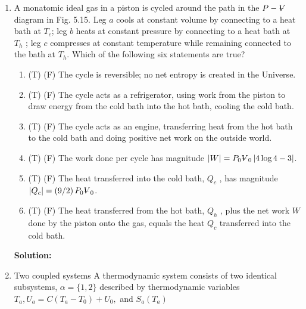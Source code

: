 \documentclass[10pt]{article}
\newenvironment{Solution}
    {\textbf{Solution:}
    
    \vspace{5mm}
    \begin{tcolorbox}
    }
    {
    \end{tcolorbox}
    \vspace{5mm}
    }
\newcommand{\vol}{{\ooalign{\hfil$V$\hfil\cr\kern0.08em--\hfil\cr}}}
\begin{document}
\begin{enumerate}
\begin{enumerate}
\begin{Solution}
    
    \end{Solution}
\end{enumerate}

\item A monatomic ideal gas in a piston is cycled around the path in the $P -\vol$ diagram in Fig. 5.15. Leg $a$ cools at constant volume by connecting to a heat bath at $T_c$; leg $b$ heats at constant pressure by connecting to a heat bath at $T_h$ ; leg $c$ compresses at constant temperature while remaining connected to the bath at $T_h$.
Which of the following six statements are true?
\begin{enumerate}
    \item (T) (F) The cycle is reversible; no net entropy is created in the Universe.
    
    \item (T) (F) The cycle acts as a refrigerator, using work from the piston to draw energy from the cold bath into the hot bath, cooling the cold bath.
    
    
    \item (T) (F) The cycle acts as an engine, transferring heat from the hot bath to the cold bath and doing positive net work on the outside world.
    
    
    \item (T) (F) The work done per cycle has magnitude $\left|W\right| = P_0 \vol_0 \left|4 \log{4} - 3\right|$.
    
    
    \item (T) (F) The heat transferred into the cold bath, $Q_c$ , has magnitude $\left|Q_c \right| = \left(9/2\right)P_0 \vol_0$.
    
    
    \item (T) (F) The heat transferred from the hot bath, $Q_h$ , plus the net work $W$ done by the piston onto the gas, equals the heat $Q_c$ transferred into the cold bath.
    
    
\end{enumerate}

\begin{Solution}


\end{Solution}

\item Two coupled systems
A thermodynamic system consists of two identical subsystems, $\alpha=\{1,2\}$ described by thermodynamic variables $T_{a}, U_{a}=C\left(T_{a}-T_{0}\right)+U_{0},$ and $S_{a}\left(T_{a}\right)$


\end{enumerate}
\end{document}
